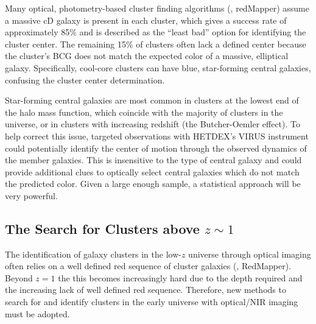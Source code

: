 Many optical, photometry-based cluster finding algorithms (\eg, redMapper) assume a massive cD galaxy is present in each cluster, which gives a success rate of approximately 85\% and is described as the ``least bad'' option for identifying the cluster center. The remaining 15\% of clusters often lack a defined center because the cluster's BCG does not match the expected color of a massive, elliptical galaxy. Specifically, cool-core clusters can have blue, star-forming central galaxies, confusing the cluster center determination.

Star-forming central galaxies are most common in clusters at the lowest end of the halo mass function, which coincide with the majority of clusters in the universe, or in clusters with increasing redshift (the Butcher-Oemler effect). To help correct this issue, targeted observations with HETDEX's VIRUS instrument could potentially identify the center of motion through the observed dynamics of the member galaxies. This is insensitive to the type of central galaxy and could provide additional clues to optically select central galaxies which do not match the predicted color. Given a large enough sample, a statistical approach will be very powerful.

\subsection{The Search for Clusters above $z\sim1$}
The identification of galaxy clusters in the low-$z$ universe through optical imaging often relies on a well defined red sequence of cluster galaxies (\eg, RedMapper). Beyond $z=1$ the this becomes increasingly hard due to the depth required and the increasing lack of well defined red sequence. Therefore, new methods to search for and identify clusters in the early universe with optical/NIR imaging must be adopted.
 
